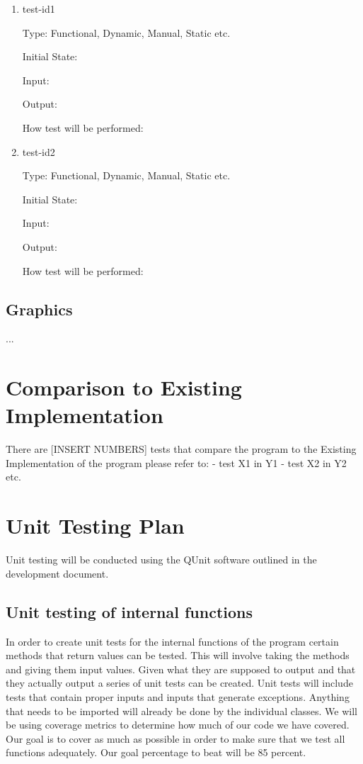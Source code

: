 \documentclass[12pt, titlepage]{article}
\begin{document}
\begin{enumerate}

\item{test-id1\\}

Type: Functional, Dynamic, Manual, Static etc.
					
Initial State: 
					
Input: 
					
Output: 
					
How test will be performed: 
					
\item{test-id2\\}

Type: Functional, Dynamic, Manual, Static etc.
					
Initial State: 
					
Input: 
					
Output: 
					
How test will be performed: 

\end{enumerate}

\subsection{Graphics}

...

	
\section{Comparison to Existing Implementation}	

There are [INSERT NUMBERS] tests that compare the program to the Existing Implementation of the program please refer to:
- test X1 in Y1
- test X2 in Y2
etc.
				
\section{Unit Testing Plan}

Unit testing will be conducted using the QUnit software outlined in the development document.
		
\subsection{Unit testing of internal functions}

In order to create unit tests for the internal functions of the program certain methods that return values
can be tested. This will involve taking the methods and giving them input values. Given what they are
supposed to output and that they actually output a series of unit tests can be created. Unit tests will include
tests that contain proper inputs and inputs that generate exceptions.  Anything that needs to be imported will already be done
by the individual classes. We will be using coverage metrics to determine how much of our code we have
covered. Our goal is to cover as much as possible in order to make sure that we test all functions adequately.
Our goal percentage to beat will be 85 percent.
		
\end{document}
